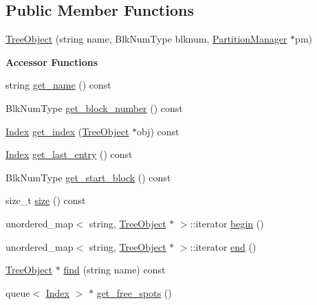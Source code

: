 \subsection*{Public Member Functions}
\begin{DoxyCompactItemize}
\item 
\mbox{\hyperlink{classTreeObject_a1ef90156e6b45ddef28c59a89cd1097d}{Tree\+Object}} (string name, Blk\+Num\+Type blknum, \mbox{\hyperlink{classPartitionManager}{Partition\+Manager}} $\ast$pm)
\end{DoxyCompactItemize}
\begin{Indent}\textbf{ Accessor Functions}\par
\begin{DoxyCompactItemize}
\item 
string \mbox{\hyperlink{classTreeObject_a5216922ec0b98bcc375601db8d253770}{get\+\_\+name}} () const
\item 
Blk\+Num\+Type \mbox{\hyperlink{classTreeObject_af7841065fe85d0884341d72669185169}{get\+\_\+block\+\_\+number}} () const
\item 
\mbox{\hyperlink{structindex}{Index}} \mbox{\hyperlink{classTreeObject_ae0983a3ff99d413e22beaaac8d7b6d12}{get\+\_\+index}} (\mbox{\hyperlink{classTreeObject}{Tree\+Object}} $\ast$obj) const
\item 
\mbox{\hyperlink{structindex}{Index}} \mbox{\hyperlink{classTreeObject_a2d7c1a4c2d36c81110ccae09d9724125}{get\+\_\+last\+\_\+entry}} () const
\item 
Blk\+Num\+Type \mbox{\hyperlink{classTreeObject_a16153734dbee4adc99fa195715728c2f}{get\+\_\+start\+\_\+block}} () const
\item 
size\+\_\+t \mbox{\hyperlink{classTreeObject_a2a3dffe29aba8965c7977312c3721b50}{size}} () const
\item 
unordered\+\_\+map$<$ string, \mbox{\hyperlink{classTreeObject}{Tree\+Object}} $\ast$ $>$\+::iterator \mbox{\hyperlink{classTreeObject_af8bb5e54c0a13e1e0e5be409153ab6d8}{begin}} ()
\item 
unordered\+\_\+map$<$ string, \mbox{\hyperlink{classTreeObject}{Tree\+Object}} $\ast$ $>$\+::iterator \mbox{\hyperlink{classTreeObject_a2544e2976f3b75cd1f0230f5f908059c}{end}} ()
\item 
\mbox{\hyperlink{classTreeObject}{Tree\+Object}} $\ast$ \mbox{\hyperlink{classTreeObject_a6a7477c29a06a9896df549f83611252f}{find}} (string name) const
\item 
queue$<$ \mbox{\hyperlink{structindex}{Index}} $>$ $\ast$ \mbox{\hyperlink{classTreeObject_aa0900ad50c10023e4700f11218d30d7a}{get\+\_\+free\+\_\+spots}} ()
\end{DoxyCompactItemize}
\end{Indent}
